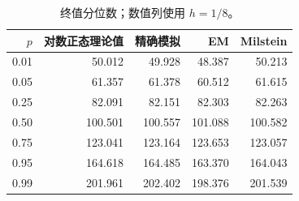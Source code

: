 \begin{table}[H]\centering\small
\caption{终值分位数；数值列使用 $h=1/8$。}\label{tab:gbm-quantile-cn}
\begin{tabular}{rrrrr}\toprule
$p$ & 对数正态理论值 & 精确模拟 & EM & Milstein\\\midrule
0.01 & 50.012 & 49.928 & 48.387 & 50.213\\
0.05 & 61.357 & 61.378 & 60.512 & 61.615\\
0.25 & 82.091 & 82.151 & 82.303 & 82.263\\
0.50 & 100.501 & 100.557 & 101.088 & 100.582\\
0.75 & 123.041 & 123.164 & 123.653 & 123.057\\
0.95 & 164.618 & 164.485 & 163.370 & 164.043\\
0.99 & 201.961 & 202.402 & 198.376 & 201.539\\
\bottomrule\end{tabular}
\end{table}
